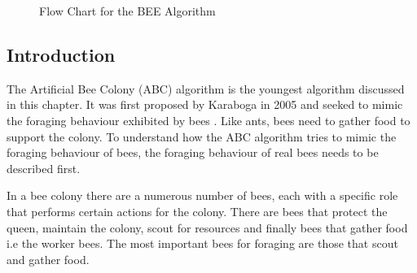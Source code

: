 \begin{figure}[p]
	\begin{center}
	\caption{Flow Chart for the BEE Algorithm}
	\label{fig:BeeAlgorithmFlowChart}
	\end{center}
\end{figure}
\subsection{Introduction}
The Artificial Bee Colony (ABC) algorithm is the youngest algorithm discussed in this chapter\cite{ABCCompareStudy,ABCLeafConstrained,ABCNumericalOptimization}. It was first proposed by Karaboga in 2005 and seeked to mimic the foraging behaviour exhibited by bees \cite{ABCCompareStudy,ABCLeafConstrained,ABCNumericalOptimization}. Like ants, bees need to gather food to support the colony. To understand how the ABC algorithm tries to mimic the foraging behaviour of bees, the foraging behaviour of real bees needs to be described first\cite{ABCCompareStudy}. 

In a bee colony there are a numerous number of bees, each with a specific role that performs certain actions for the colony. There are bees that protect the queen, maintain the colony, scout for resources and finally bees that gather food i.e the worker bees. The most important bees for foraging are those that scout and gather food\cite{ABCCompareStudy}. 

